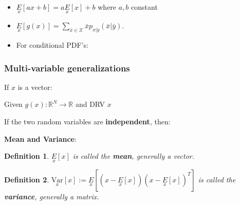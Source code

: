 \documentclass[10pt,a4paper]{scrartcl}
\newtheorem{define}{Definition}
\begin{document}
\begin{multicols*}{2}
\begin{itemize}
\item $\underset{x}{E}[ax+b]=a\underset{x}{E}[x]+b$ where $a,b$ constant
\item $\underset{x}{E}[g(x)]=\sum\limits_{\bar{x}\in\mathcal{X}}\bar{x}p_{x|y}(\bar{x}|\bar{y})$.
\item For conditional PDF's:
\end{itemize}


\subsubsection{Multi-variable generalizations}

If $x$ is a vector:

\mportant{$\underset{x}{E}[x]=\sum\limits_{\bar{x}\in\mathcal{X}}\bar{x}p_x(\bar{x})=\sum\limits_{\bar{x_1}\in\mathcal{X}}\cdots\sum\limits_{\bar{x}_N\in\mathcal{X}}[\bar{x}_1,\ldots,\bar{x}_N]^Tp_{(x_1,\ldots,x_N)}(\bar{x}_1,\ldots,\bar{x}_N]$}

Given $g(x):\mathbb{R}^N\rightarrow \mathbb{R}$ and DRV $x$


If the two random variables are \textbf{independent}, then:


\textbf{Mean and Variance}:

\begin{define}
$\underset{x}{E}[x]$ is called the \textbf{mean}, generally a vector.
\end{define}

\begin{define}
$\underset{x}{\text{Var}}[x]:=\underset{x}{E}\left[\left(x-\underset{x}{E}[x]\right)\left(x-\underset{x}{E}[x]\right)^T\right]$ is called the \textbf{variance}, generally a matrix.
\end{define}


\end{multicols*}
\end{document}
